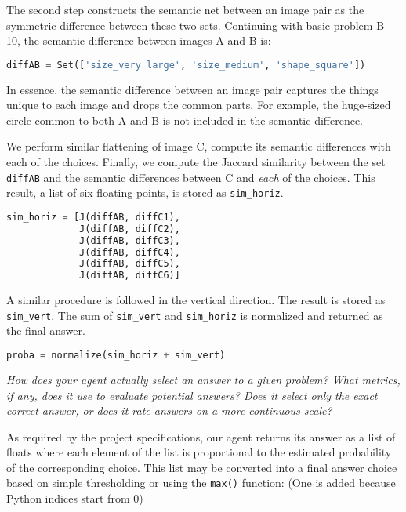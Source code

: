 \documentclass[10pt,letterpaper]{article}
\newcommand{\mypar}{\par{\vspace{0.2cm}}}
\newcommand{\rubric}[1]{\mypar{}\textcolor{mygray}{\emph{#1}}\mypar{}}
\begin{document}
The second step constructs the semantic net between an image pair as the symmetric difference between these two sets. Continuing with basic problem B--10, the semantic difference between images A and B is:

\begin{small}
\begin{lstlisting}[language=python]
diffAB = Set(['size_very large', 'size_medium', 'shape_square'])
\end{lstlisting}
\end{small}

In essence, the semantic difference between an image pair captures the things unique to each image and drops the common parts. For example, the huge-sized circle common to both A and B is not included in the semantic difference. 

We perform similar flattening of image C, compute its semantic differences with each of the choices. Finally, we compute the Jaccard similarity between the set {\tt diffAB} and the semantic differences between C and {\em each} of the choices.  This result, a list of six floating points, is stored as {\tt sim\_horiz}.
\begin{small}
\begin{lstlisting}[language=python]
sim_horiz = [J(diffAB, diffC1), 
             J(diffAB, diffC2), 
             J(diffAB, diffC3),  
             J(diffAB, diffC4), 
             J(diffAB, diffC5), 
             J(diffAB, diffC6)]
\end{lstlisting}
\end{small}

A similar procedure is followed in the vertical direction. The result is stored as {\tt sim\_vert}. The sum of {\tt sim\_vert} and {\tt sim\_horiz} is normalized and returned as the final answer. 

\begin{small}
\begin{lstlisting}[language=python]
proba = normalize(sim_horiz + sim_vert)
\end{lstlisting}
\end{small}

\rubric{How does your agent actually select an answer to a given problem? What metrics, if any, does it use to evaluate potential answers? Does it select only the exact correct answer, or does it rate answers on a more continuous scale?}

As required by the project specifications, our agent returns its answer as a list of floats where each element of the list is proportional to the estimated probability of the corresponding choice. This list may be converted into a final answer choice based on simple thresholding or using the {\tt max()} function: (One is added because Python indices start from 0)
\end{document}
